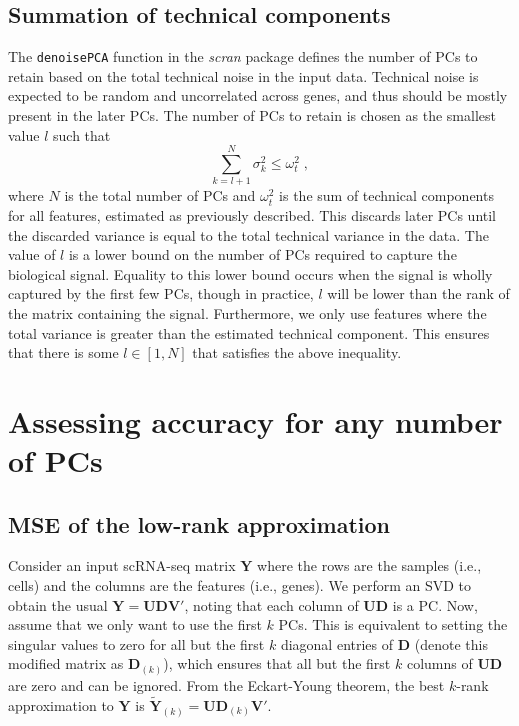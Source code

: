 \documentclass[10pt,letterpaper]{article}
\newcommand\code[1]{{\small\texttt{#1}}}
\begin{document}
\subsection{Summation of technical components}
The \code{denoisePCA} function in the \textit{scran} package \cite{lun2016stepbystep} defines the number of PCs to retain based on the total technical noise in the input data.
Technical noise is expected to be random and uncorrelated across genes, and thus should be mostly present in the later PCs.
The number of PCs to retain is chosen as the smallest value $l$ such that 
\[
    \sum_{k=l+1}^N \sigma^2_k  \le \omega^2_t \;,
\]
where $N$ is the total number of PCs and $\omega^2_t$ is the sum of technical components for all features, estimated as previously described.
This discards later PCs until the discarded variance is equal to the total technical variance in the data.
The value of $l$ is a lower bound on the number of PCs required to capture the biological signal.
Equality to this lower bound occurs when the signal is wholly captured by the first few PCs,
though in practice, $l$ will be lower than the rank of the matrix containing the signal.
Furthermore, we only use features where the total variance is greater than the estimated technical component.
This ensures that there is some $l \in [1, N]$ that satisfies the above inequality.

\section{Assessing accuracy for any number of PCs}

\subsection{MSE of the low-rank approximation}
Consider an input scRNA-seq matrix $\mathbf{Y}$ where the rows are the samples (i.e., cells) and the columns are the features (i.e., genes).
We perform an SVD to obtain the usual $\mathbf{Y} = \mathbf{U}\mathbf{D}\mathbf{V}'$, noting that each column of $\mathbf{U}\mathbf{D}$ is a PC.
Now, assume that we only want to use the first $k$ PCs.
This is equivalent to setting the singular values to zero for all but the first $k$ diagonal entries of $\mathbf{D}$ (denote this modified matrix as $\mathbf{D}_{(k)}$),
which ensures that all but the first $k$ columns of $\mathbf{U}\mathbf{D}$ are zero and can be ignored.
From the Eckart-Young theorem, the best $k$-rank approximation to $\mathbf{Y}$ is $\mathbf{\tilde Y}_{(k)} =  \mathbf{U}\mathbf{D}_{(k)}\mathbf{V}'$.
\end{document}
